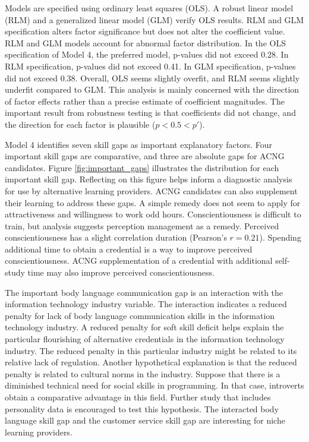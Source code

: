 \documentclass[review]{elsarticle}
\begin{document}
Models are specified using ordinary least squares (OLS).
A robust linear model (RLM) and a generalized linear model (GLM) verify OLS results.
RLM and GLM specification alters factor significance but does not alter the coefficient value.
RLM and GLM models account for abnormal factor distribution.
In the OLS specification of Model 4, the preferred model, p-values did not exceed 0.28.
In RLM specification, p-values did not exceed 0.41.
In GLM specification, p-values did not exceed 0.38.
Overall, OLS seems slightly overfit, and RLM seems slightly underfit compared to GLM.
This analysis is mainly concerned with the direction of factor effects
rather than a precise estimate of coefficient magnitudes.
The important result from robustness testing is that coefficients did not change,
and the direction for each factor is plausible ($p < 0.5 < p'$).

Model 4 identifies seven skill gaps as important explanatory factors.
Four important skill gaps are comparative, and three are absolute gaps for ACNG candidates.
Figure \ref{fig:important_gaps} illustrates the distribution for each important skill gap.
Reflecting on this figure helps inform a diagnostic analysis for use by alternative learning providers.
ACNG candidates can also supplement their learning to address these gaps.
A simple remedy does not seem to apply for attractiveness and willingness to work odd hours.
Conscientiousness is difficult to train, but analysis suggests perception management as a remedy.
Perceived conscientiousness has a slight correlation duration (Pearson's $r = 0.21$).
Spending additional time to obtain a credential is a way to improve perceived conscientiousness.
ACNG supplementation of a credential with additional self-study time may also improve perceived conscientiousness.

The important body language communication gap is an interaction with the information technology industry variable.
The interaction indicates a reduced penalty for lack of body language communication skills
in the information technology industry.
A reduced penalty for soft skill deficit helps explain the particular flourishing of
alternative credentials in the information technology industry.
The reduced penalty in this particular industry might be related to its relative lack of regulation.
Another hypothetical explanation is that the reduced penalty is related to cultural norms in the industry.
Suppose that there is a diminished technical need for social skills in programming.
In that case, introverts obtain a comparative advantage in this field.
Further study that includes personality data is encouraged to test this hypothesis.
The interacted body language skill gap and the customer service skill gap
are interesting for niche learning providers.
\end{document}
